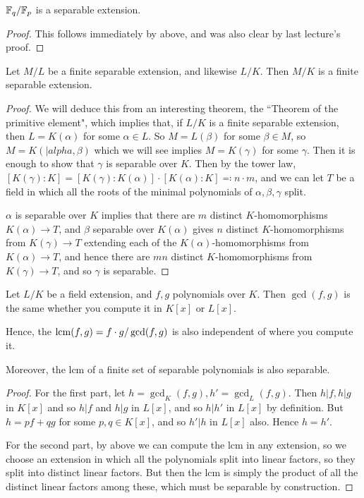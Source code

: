 \documentclass[a4paper, 10pt, twocolumn]{amsart}
\begin{document}
\begin{corollary}
$\mathbb{F}_q / \mathbb{F}_p$ is a separable extension.
\end{corollary}
\begin{proof}
This follows immediately by above, and was also clear by last lecture's proof.
\end{proof}
\begin{proposition}
Let $M/L$ be a finite separable extension, and likewise $L/K$. Then $M/K$ is a finite separable extension.
\end{proposition}
\begin{proof}
We will deduce this from an interesting theorem, the ``Theorem of the primitive element", which implies that, if $L/K$ is a finite separable extension, then $L = K(\alpha)$ for some $\alpha \in L$. So $M = L(\beta)$ for some $\beta \in M$, so $M = K(|alpha, \beta)$ which we will see implies $M = K(\gamma)$ for some $\gamma$. Then it is enough to show that $\gamma$ is separable over $K$. Then by the tower law, $[K(\gamma):K] = [K(\gamma):K(\alpha)]\cdot [K(\alpha):K] \eqqcolon n\cdot m$, and we can let $T$ be a field in which all the roots of the minimal polynomials of $\alpha, \beta, \gamma$ split.

$\alpha$ is separable over $K$ implies that there are $m$ distinct $K$-homomorphisms $K(\alpha) \to T$, and $\beta$ separable over $K(\alpha)$ gives $n$ distinct $K$-homomorphisms from $K(\gamma) \to T$ extending each of the $K(\alpha)$-homomorphisms from $K(\alpha)\to T$, and hence there are $mn$ distinct $K$-homomorphisms from $K(\gamma) \to T$, and so $\gamma$ is separable.
\end{proof}

\begin{lemma}
Let $L/K$ be a field extension, and $f, g$ polynomials over $K$. Then $\gcd(f,g)$ is the same whether you compute it in $K[x]$ or $L[x]$.

Hence, the $\operatorname{lcm}(f,g) = f\cdot g / \gcd(f,g)$ is also independent of where you compute it.

Moreover, the lcm of a finite set of separable polynomials is also separable.
\end{lemma}
\begin{proof}
For the first part, let $h=\gcd_K(f,g), h' = \gcd_L(f,g)$. Then $h|f, h|g$ in $K[x]$ and so $h|f$ and $h|g$ in $L[x]$, and so $h|h'$ in $L[x]$ by definition. But $h = pf+qg$ for some $p,q \in K[x]$, and so $h'|h$ in $L[x]$ also. Hence $h=h'$.

For the second part, by above we can compute the lcm in any extension, so we choose an extension in which all the polynomials split into linear factors, so they split into distinct linear factors. But then the lcm is simply the product of all the distinct linear factors among these, which must be separable by construction.
\end{proof}
\end{document}
